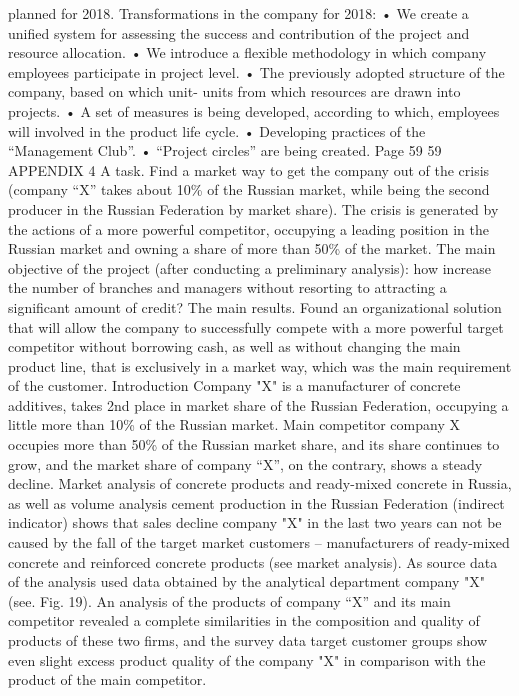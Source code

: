planned for 2018.
Transformations in the company for 2018:
• We create a unified system for assessing the success and contribution of the project and
resource allocation.
• We introduce a flexible methodology in which company employees participate in
project level.
• The previously adopted structure of the company, based on which unit-
units from which resources are drawn into projects.
• A set of measures is being developed, according to which, employees will
involved in the product life cycle.
• Developing practices of the “Management Club”.
• “Project circles” are being created.
Page 59
59
APPENDIX 4
A task.
Find a market way to get the company out of the crisis (company “X” takes
about 10\% of the Russian market, while being the second producer in the Russian Federation by market share).
The crisis is generated by the actions of a more powerful competitor, occupying a leading
position in the Russian market and owning a share of more than 50\% of the market.
The main objective of the project (after conducting a preliminary analysis): how
increase the number of branches and managers without resorting to attracting
a significant amount of credit?
The main results.
Found an organizational solution that will allow the company to successfully
compete with a more powerful target competitor without borrowing
cash, as well as without changing the main product line, that is
exclusively in a market way, which was the main requirement of the customer.
Introduction
Company "X" is a manufacturer of concrete additives, takes 2nd place in
market share of the Russian Federation, occupying a little more than 10\% of the Russian market. Main competitor
company X occupies more than 50\% of the Russian market share, and its share continues to grow,
and the market share of company “X”, on the contrary, shows a steady decline.
Market analysis of concrete products and ready-mixed concrete in Russia, as well as volume analysis
cement production in the Russian Federation (indirect indicator) shows that sales decline
company "X" in the last two years can not be caused by the fall of the target market
customers -- manufacturers of ready-mixed concrete and reinforced concrete products (see market analysis). As
source data of the analysis used data obtained by the analytical department
company "X" (see. Fig. 19).
An analysis of the products of company “X” and its main competitor revealed a complete
similarities in the composition and quality of products of these two firms, and the survey data
target customer groups show even slight excess
product quality of the company "X" in comparison with the product of the main competitor.
